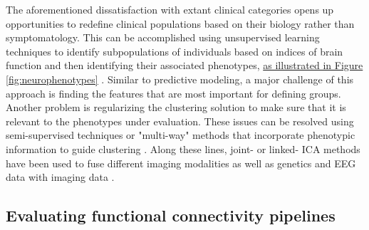 \documentclass{bmcart}
\newcommand{\ADDED}[1]{\textcolor{markercolor}{\uline{#1}}}
\begin{document}
The aforementioned dissatisfaction with extant clinical categories opens up opportunities to redefine clinical populations based on their biology rather than symptomatology. This can be accomplished using unsupervised learning techniques to identify subpopulations of individuals based on indices of brain function and then identifying their associated phenotypes, \ADDED{as illustrated in Figure \ref{fig:neurophenotypes}} \cite{Gates2014}. Similar to predictive modeling, a major challenge of this approach is finding the features that are most important for defining groups. Another problem is regularizing the clustering solution to make sure that it is relevant to the phenotypes under evaluation. These issues can be resolved using semi-supervised techniques or "multi-way" methods that incorporate phenotypic information to guide clustering \cite{Morup2011}. Along these lines, joint- or linked- ICA methods have been used to fuse different imaging modalities \cite{Franco2008, Groves2011} as well as genetics and EEG data with imaging data \cite{Calhoun2009}. 

\subsection{Evaluating functional connectivity pipelines}
\end{document}
